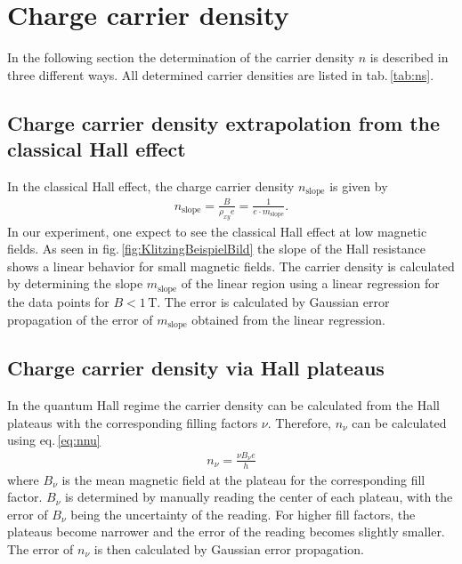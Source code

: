 \section{Charge carrier density}
In the following section the determination of the carrier density $n$ is described in three different ways.
All determined carrier densities are listed in tab.\,\ref{tab:ns}.
\subsection{Charge carrier density extrapolation from the classical Hall effect}
In the classical Hall effect, the charge carrier density $n_\text{slope}$ is given by 
\begin{align}
    n_\text{slope} = \frac{B}{\rho_{xy}e} = \frac{1}{e \cdot m_\text{slope}}.
    \label{eq:chargeCarrierClassicalHall}
\end{align}
In our experiment, one expect to see the classical Hall effect at low magnetic fields.
As seen in fig.\,\ref{fig:KlitzingBeispielBild} the slope of the Hall resistance shows a linear behavior for small magnetic fields.
The carrier density is calculated by determining the slope $m_\text{slope}$ of the linear region using a linear regression for the data points for $B<1\,\text{T}$.
The error is calculated by Gaussian error propagation of the error of $m_\text{slope}$ obtained from the linear regression.

\subsection{Charge carrier density via Hall plateaus}
In the quantum Hall regime the carrier density can be calculated from the Hall plateaus with the corresponding filling factors $\nu$.
Therefore, $n_\nu$ can be calculated using eq.\,\ref{eq:nnu} 
\begin{align} 
    n_\nu = \frac{\nu B_\nu e}{h} \label{eq:nnu} 
\end{align} 
where $B_\nu$ is the mean magnetic field at the plateau for the corresponding fill factor.
$B_\nu$ is determined by manually reading the center of each plateau, with the error of $B_\nu$ being the uncertainty of the reading. For higher fill factors, the plateaus become narrower and the error of the reading becomes slightly smaller.
The error of $n_\nu$ is then calculated by Gaussian error propagation.

